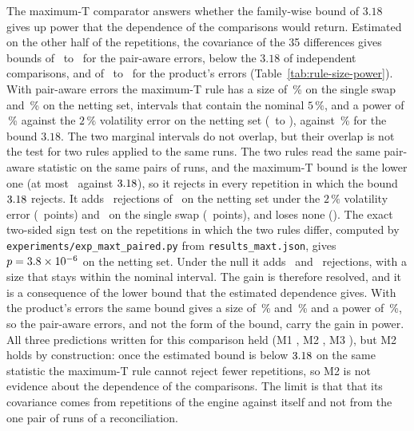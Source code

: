 The maximum-T comparator answers whether the family-wise bound of $3.18$ gives up power that the dependence of the comparisons would return. Estimated on the other half of the repetitions, the covariance of the 35 differences gives bounds of \nMaxtPairBoundLow\ to \nMaxtPairBoundHigh\ for the pair-aware errors, below the $3.18$ of independent comparisons, and of \nMaxtProdBoundLow\ to \nMaxtProdBoundHigh\ for the product's errors (Table~\ref{tab:rule-size-power}). With pair-aware errors the maximum-T rule has a size of \nSizePairMaxtSingle\,\% on the single swap and \nSizePairMaxtNetting\,\% on the netting set, intervals that contain the nominal $5\,\%$, and a power of \nPowerPairMaxtSigmaTwo\,\% against the $2\,\%$ volatility error on the netting set (\nPowerPairMaxtSigmaTwoLo\ to \nPowerPairMaxtSigmaTwoHi), against \nPowerRefineSigmaTwo\,\% for the bound $3.18$. The two marginal intervals do not overlap, but their overlap is not the test for two rules applied to the same runs. The two rules read the same pair-aware statistic on the same pairs of runs, and the maximum-T bound is the lower one (at most \nMaxtPairBoundHigh\ against $3.18$), so it rejects in every repetition in which the bound $3.18$ rejects. It adds \nMaxtExtraNetting\ rejections of \nMaxtPairedReps\ on the netting set under the $2\,\%$ volatility error (\nMaxtGainNetting\ points) and \nMaxtExtraSingle\ on the single swap (\nMaxtGainSingle\ points), and loses none (\nMaxtLostMax). The exact two-sided sign test on the repetitions in which the two rules differ, computed by \texttt{experiments/exp\_maxt\_paired.py} from \texttt{results\_maxt.json}, gives $p=3.8\times10^{-6}$ on the netting set. Under the null it adds \nMaxtExtraNullNetting\ and \nMaxtExtraNullSingle\ rejections, with a size that stays within the nominal interval. The gain is therefore resolved, and it is a consequence of the lower bound that the estimated dependence gives. With the product's errors the same bound gives a size of \nSizeMaxtSingle\,\% and \nSizeMaxtNetting\,\% and a power of \nPowerMaxtSigmaTwo\,\%, so the pair-aware errors, and not the form of the bound, carry the gain in power. All three predictions written for this comparison held (M1 \nPredMone, M2 \nPredMtwo, M3 \nPredMthree), but M2 holds by construction: once the estimated bound is below $3.18$ on the same statistic the maximum-T rule cannot reject fewer repetitions, so M2 is not evidence about the dependence of the comparisons. The limit is that that its covariance comes from repetitions of the engine against itself and not from the one pair of runs of a reconciliation.

